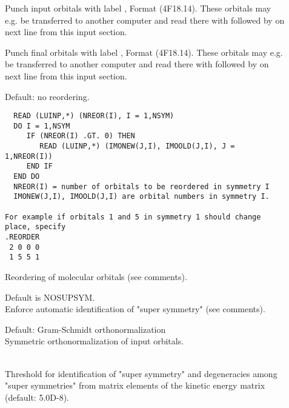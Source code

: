 \begin{description}

\item[]
  Punch input orbitals with label , Format (4F18.14).
  These orbitals may e.g. be transferred to another computer and
  read there with  followed by  on
  next line from this input section.

\item[]
  Punch final orbitals with label , Format (4F18.14).
  These orbitals may e.g. be transferred to another computer and
  read there with  followed by  on
  next line from this input section.

\item[]
Default: no reordering.
\begin{verbatim}
  READ (LUINP,*) (NREOR(I), I = 1,NSYM)
  DO I = 1,NSYM
     IF (NREOR(I) .GT. 0) THEN
        READ (LUINP,*) (IMONEW(J,I), IMOOLD(J,I), J = 1,NREOR(I))
     END IF
  END DO
  NREOR(I) = number of orbitals to be reordered in symmetry I
  IMONEW(J,I), IMOOLD(J,I) are orbital numbers in symmetry I.

For example if orbitals 1 and 5 in symmetry 1 should change place, specify
.REORDER
 2 0 0 0
 1 5 5 1
\end{verbatim}
  Reordering of molecular orbitals (see comments).

\item[]
  Default is NOSUPSYM.\\
  Enforce automatic identification of "super
  symmetry" (see comments).

\item[]
  Default: Gram-Schmidt orthonormalization\\
  Symmetric orthonormalization of input
  orbitals.

\item[]
   \\
  Threshold for identification of "super
  symmetry" and degeneracies among
  "super symmetries" from matrix elements of the kinetic energy matrix
  (default: 5.0D-8).

\end{description}


